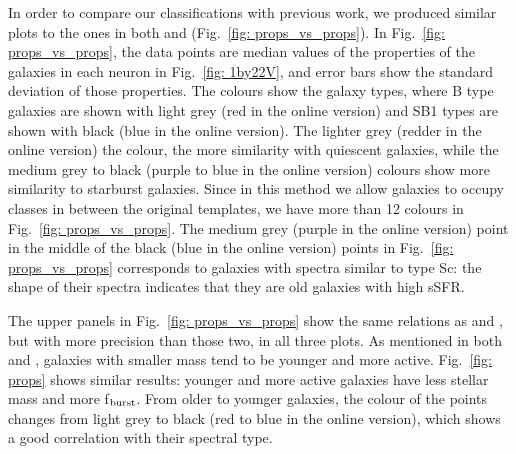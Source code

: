         In order to compare our classifications with previous work, we produced similar plots to the ones in both  and  (Fig.~\ref{fig: props_vs_props}).
        In Fig.~\ref{fig: props_vs_props}, the data points are median values of the properties of the galaxies in each neuron in Fig.~\ref{fig: 1by22V}, and error bars show the standard deviation of those properties.
        The colours show the galaxy types, where B type galaxies are shown with light grey (red in the online version) and SB1 types are shown with black (blue in the online version).
        The lighter grey (redder in the online version) the colour, the more similarity with quiescent galaxies, while the medium grey to black (purple to blue in the online version) colours show more similarity to starburst galaxies.
        Since in this method we allow galaxies to occupy classes in between the original  templates, we have more than 12 colours in Fig.~\ref{fig: props_vs_props}.
        The medium grey (purple in the online version) point in the middle of the black (blue in the online version) points in Fig.~\ref{fig: props_vs_props} corresponds to galaxies with spectra similar to type Sc: the shape of their spectra indicates that they are old galaxies with high sSFR.
        
        The upper panels in Fig.~\ref{fig: props_vs_props} show the same relations as  and , but with more precision than those two, in all three plots.
        As mentioned in both  and , galaxies with smaller mass tend to be younger and more active.
        Fig.~\ref{fig: props} shows similar results: younger and more active galaxies have less stellar mass and more f$_{\rm {burst}}$.
        From older to younger galaxies, the colour of the points changes from light grey to black (red to blue in the online version), which shows a good correlation with their spectral type.
        
